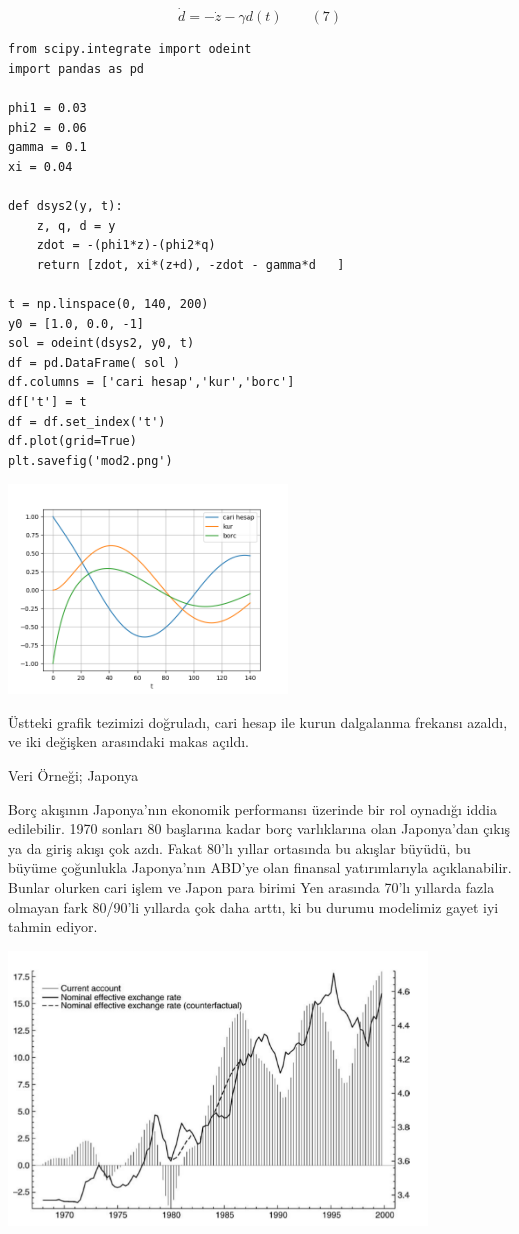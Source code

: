\documentclass[12pt,fleqn]{article}\usepackage{../../common}
\begin{document}
$$
\dot{d} = -\dot{z}-\gamma d(t) \qquad (7)
$$

\begin{verbatim}
from scipy.integrate import odeint
import pandas as pd

phi1 = 0.03
phi2 = 0.06
gamma = 0.1
xi = 0.04

def dsys2(y, t):
    z, q, d = y
    zdot = -(phi1*z)-(phi2*q)
    return [zdot, xi*(z+d), -zdot - gamma*d   ]

t = np.linspace(0, 140, 200)
y0 = [1.0, 0.0, -1]
sol = odeint(dsys2, y0, t)
df = pd.DataFrame( sol )
df.columns = ['cari hesap','kur','borc']
df['t'] = t
df = df.set_index('t')
df.plot(grid=True)
plt.savefig('mod2.png')
\end{verbatim}

\includegraphics[width=20em]{mod2.png}

Üstteki grafik tezimizi doğruladı, cari hesap ile kurun dalgalanma frekansı
azaldı, ve iki değişken arasındaki makas açıldı. 

Veri Örneği; Japonya

Borç akışının Japonya'nın ekonomik performansı üzerinde bir rol oynadığı
iddia edilebilir. 1970 sonları 80 başlarına kadar borç varlıklarına olan
Japonya'dan çıkış ya da giriş akışı çok azdı. Fakat 80'lı yıllar ortasında
bu akışlar büyüdü, bu büyüme çoğunlukla Japonya'nın ABD'ye olan finansal
yatırımlarıyla açıklanabilir. Bunlar olurken cari işlem ve Japon para
birimi Yen arasında 70'lı yıllarda fazla olmayan fark 80/90'li yıllarda çok
daha arttı, ki bu durumu modelimiz gayet iyi tahmin ediyor.

\includegraphics[width=30em]{japan-acc-model2.png}
\end{document}
